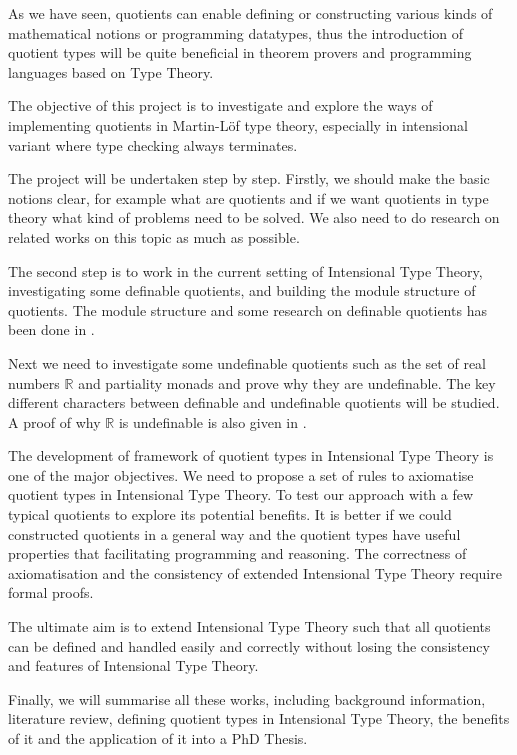 \documentclass{article}
\theoremstyle{definition}
\newcommand{\R}{\mathbb{R}}
\newcommand{\itt}{Intensional Type Theory}
\newcommand{\mltt}{Martin-L\"{o}f type theory}
\begin{document}
As we have seen, quotients can enable defining or constructing various kinds of
mathematical notions or programming datatypes, thus the introduction of
quotient types will be quite beneficial in theorem provers and
programming languages based on Type Theory. 

The objective of this project is to investigate and explore the ways of
implementing quotients in \mltt{}, especially in intensional
variant where type checking always terminates.


The project will be undertaken step by step. Firstly, we should make
the basic notions clear, for example what are quotients and if we want
quotients in type theory what kind of problems need to be solved. We
also need to do research on related works on this topic as much as
possible.

The second step is to work in the current setting of \itt{},
investigating some definable quotients, and building the module structure of quotients. The module structure
and some research on definable quotients has been done in
\cite{aan}.

Next we need to investigate some undefinable quotients such as the set
of real numbers $\R$ and partiality monads and prove why they are undefinable. The
key different characters between definable and undefinable quotients
will be studied. A proof of why $\R$ is undefinable is also given in
\cite{aan}.

The development of framework of quotient types in \itt{} is one of the major
objectives. We need to propose a set of rules to axiomatise quotient
types in \itt{}. To test our approach with a few typical quotients
to explore its potential benefits. It is better if we could
constructed quotients in a general way and the quotient types have
useful properties that facilitating programming and reasoning.
The correctness of axiomatisation
and the consistency of extended \itt{} require formal proofs.


The ultimate aim is to extend \itt{} such that all quotients can be
defined and handled easily and correctly without losing the consistency
and features of \itt{}.

Finally, we will summarise all these works, including background
information, literature review, defining quotient types in
\itt{}, the benefits of it and the application of it into a PhD Thesis.


\end{document}
